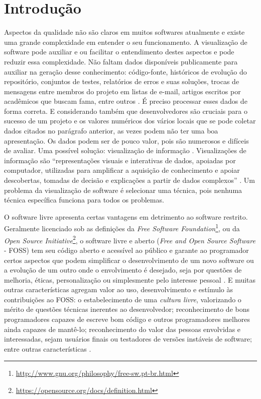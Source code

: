 \chapter{Introdução}


Aspectos da qualidade não são claros em muitos softwares atualmente e existe
uma grande complexidade em entender o seu funcionamento. A visualização de
software pode auxiliar e ou facilitar o entendimento destes aspectos e pode
reduzir essa complexidade. Não faltam dados disponíveis publicamente para
auxiliar na geração desse conhecimento: código-fonte, históricos de evolução do
repositório, conjuntos de testes, relatórios de erros e suas soluções, trocas
de mensagens entre membros do projeto em listas de e-mail, artigos escritos por
acadêmicos que buscam fama, entre outros \cite{messias2012}
\cite{benkler2006wealth}. É preciso processar esses dados de forma correta. E
considerando também que desenvolvedores são cruciais para o sucesso de um
projeto e os valores numéricos dos vários locais que se pode coletar dados
citados no parágrafo anterior, as vezes podem não ter uma boa apresentação. Os
dados podem ser de pouco valor, pois são numerosos e difíceis de avaliar. Uma
possível solução: visualização de informação \cite{messias2012}. Visualizações
de informação são ``representações visuais e interativas de dados, apoiadas por
computador, utilizadas para amplificar a aquisição de conhecimento e apoiar
descobertas, tomadas de decisão e explicações a partir de dados complexos''
\cite{card1999readings}. Um problema da visualização de software é selecionar
uma técnica, pois nenhuma técnica específica funciona para todos os problemas.

O software livre apresenta certas vantagens em detrimento ao software restrito.
Geralmente licenciado sob as definições da
\textit{Free Software Foundation}\footnote{\url{http://www.gnu.org/philosophy/free-sw.pt-br.html}},
ou da \textit{Open Source Initiative}\footnote{\url{https://opensource.org/docs/definition.html}},
o software livre e aberto (\textit{Free and Open Source Software} - FOSS) tem
seu código aberto e acessível ao público e garante ao programador certos
aspectos que podem simplificar o desenvolvimento de um novo software ou a
evolução de um outro onde o envolvimento é desejado, seja por questões de
melhoria, éticas, personalização ou simplesmente pelo interesse pessoal
\cite{meirelles2013monitoramento}. E muitas outras características agregam
valor ao uso, desenvolvimento e estímulo às contribuições ao FOSS: o
estabelecimento de uma \textit{cultura livre}, valorizando o mérito de questões
técnicas inerentes ao desenvolvedor; reconhecimento de bons programadores
capazes de escreve bom código e outros programadores melhores ainda capazes de
mantê-lo; reconhecimento do valor das pessoas envolvidas e interessadas, sejam
usuários finais ou testadores de versões instáveis de software; entre outras
características \cite{raymond1999cathedral}.

